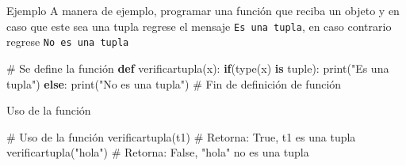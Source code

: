 \documentclass[
  ignorenonframetext,
  aspectratio=169,
  spanish,
]{beamer}
\newenvironment{Shaded}{\begin{snugshade}}{\end{snugshade}}
\newcommand{\BuiltInTok}[1]{\textcolor[rgb]{0.00,0.23,0.31}{#1}}
\newcommand{\CommentTok}[1]{\textcolor[rgb]{0.37,0.37,0.37}{#1}}
\newcommand{\ControlFlowTok}[1]{\textcolor[rgb]{0.00,0.23,0.31}{\textbf{#1}}}
\newcommand{\KeywordTok}[1]{\textcolor[rgb]{0.00,0.23,0.31}{\textbf{#1}}}
\newcommand{\NormalTok}[1]{\textcolor[rgb]{0.00,0.23,0.31}{#1}}
\newcommand{\StringTok}[1]{\textcolor[rgb]{0.13,0.47,0.30}{#1}}
\begin{document}
\begin{frame}[fragile]{Ejemplo}
\label{ejemplo}
A manera de ejemplo, programar una función que reciba un objeto y en
caso que este sea una tupla regrese el mensaje
\texttt{\textquotesingle{}Es\ una\ tupla\textquotesingle{}}, en caso
contrario regrese
\texttt{\textquotesingle{}No\ es\ una\ tupla\textquotesingle{}}

\begin{Shaded}
\begin{Highlighting}[numbers=left,,]
\CommentTok{\# Se define la función }
\KeywordTok{def}\NormalTok{ verificartupla(x):}
  \ControlFlowTok{if}\NormalTok{(}\BuiltInTok{type}\NormalTok{(x) }\KeywordTok{is} \BuiltInTok{tuple}\NormalTok{):}
    \BuiltInTok{print}\NormalTok{(}\StringTok{"Es una tupla"}\NormalTok{)}
  \ControlFlowTok{else}\NormalTok{:}
    \BuiltInTok{print}\NormalTok{(}\StringTok{"No es una tupla"}\NormalTok{)}
\CommentTok{\# Fin de definición de función}
\end{Highlighting}
\end{Shaded}
\end{frame}

\begin{frame}[fragile]{Uso de la función}
\label{uso-de-la-funciuxf3n}
\begin{Shaded}
\begin{Highlighting}[]
\CommentTok{\# Uso de  la función }
\NormalTok{verificartupla(t1) }\CommentTok{\# Retorna: \textasciigrave{}True\textasciigrave{}, \textasciigrave{}t1\textasciigrave{} es una tupla}
\NormalTok{verificartupla(}\StringTok{"hola"}\NormalTok{) }\CommentTok{\# Retorna: \textasciigrave{}False\textasciigrave{}, \textasciigrave{}"hola"\textasciigrave{} no es una tupla}
\end{Highlighting}
\end{Shaded}
\end{frame}
\end{document}
